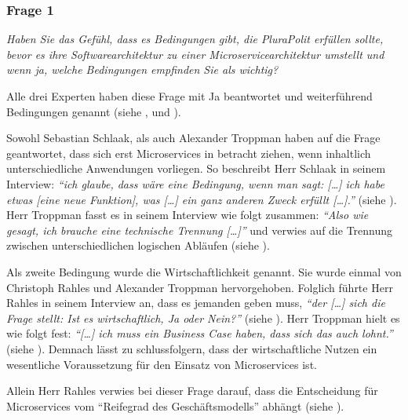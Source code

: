 \subsubsection{Frage 1}

\textit{Haben Sie das Gefühl, dass es Bedingungen gibt, die PluraPolit erfüllen sollte, bevor es ihre Softwarearchitektur zu einer Microservicearchitektur umstellt und wenn ja, welche Bedingungen empfinden Sie als wichtig?}

Alle drei Experten haben diese Frage mit Ja beantwortet und weiterführend Bedingungen genannt (siehe ,  und ).

Sowohl Sebastian Schlaak, als auch Alexander Troppman haben auf die Frage geantwortet, dass sich erst Microservices in betracht ziehen, wenn inhaltlich unterschiedliche Anwendungen vorliegen. So beschreibt Herr Schlaak in seinem Interview: \textit{\enquote{ich glaube, dass wäre eine Bedingung, wenn man sagt: […] ich habe etwas [eine neue Funktion], was […] ein ganz anderen Zweck erfüllt […].}} (siehe ). Herr Troppman fasst es in seinem Interview wie folgt zusammen:  \textit{\enquote{Also wie gesagt, ich brauche eine technische Trennung […]}} und verwies auf die Trennung zwischen unterschiedlichen logischen Abläufen (siehe ).

Als zweite Bedingung wurde die Wirtschaftlichkeit genannt. Sie wurde einmal von Christoph Rahles und Alexander Troppman hervorgehoben. Folglich führte Herr Rahles in seinem Interview an, dass es jemanden geben muss, \textit{\enquote{der […] sich die Frage stellt: Ist es wirtschaftlich, Ja oder Nein?}} (siehe ). Herr Troppman hielt es wie folgt fest: \textit{\enquote{[…] ich muss ein Business Case haben, dass sich das auch lohnt.}} (siehe ). Demnach lässt zu schlussfolgern, dass der wirtschaftliche Nutzen ein wesentliche Voraussetzung für den Einsatz von Microservices ist.

Allein Herr Rahles verwies bei dieser Frage darauf, dass die Entscheidung für Microservices vom “Reifegrad des Geschäftsmodells” abhängt (siehe ).
